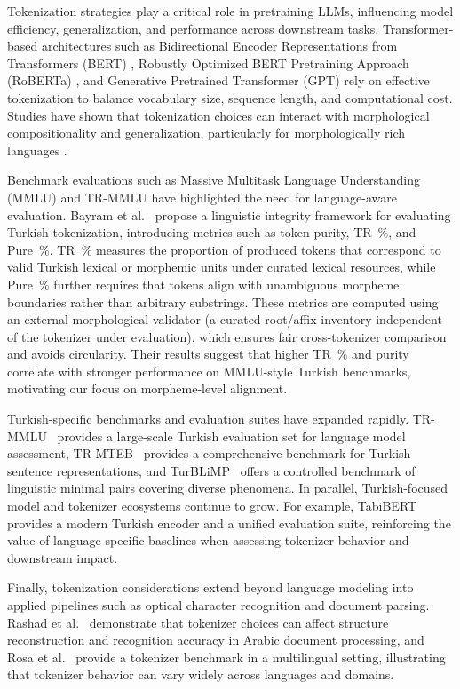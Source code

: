 Tokenization strategies play a critical role in pretraining LLMs, influencing model efficiency, generalization, and performance across downstream tasks. Transformer-based architectures such as Bidirectional Encoder Representations from Transformers (BERT) \cite{devlin_bert_2019}, Robustly Optimized BERT Pretraining Approach (RoBERTa) \cite{liu_roberta_2019}, and Generative Pretrained Transformer (GPT) \cite{radford_language_2019} rely on effective tokenization to balance vocabulary size, sequence length, and computational cost. Studies have shown that tokenization choices can interact with morphological compositionality and generalization, particularly for morphologically rich languages \cite{ismayilzada_evaluating_2025}.

Benchmark evaluations such as Massive Multitask Language Understanding (MMLU) \cite{hendrycks_measuring_2021} and TR-MMLU \cite{bayram_setting_2025} have highlighted the need for language-aware evaluation. Bayram et al.~\cite{bayram_tokenization_2025} propose a linguistic integrity framework for evaluating Turkish tokenization, introducing metrics such as token purity, TR~\%, and Pure~\%. TR~\% measures the proportion of produced tokens that correspond to valid Turkish lexical or morphemic units under curated lexical resources, while Pure~\% further requires that tokens align with unambiguous morpheme boundaries rather than arbitrary substrings. These metrics are computed using an external morphological validator (a curated root/affix inventory independent of the tokenizer under evaluation), which ensures fair cross-tokenizer comparison and avoids circularity. Their results suggest that higher TR~\% and purity correlate with stronger performance on MMLU-style Turkish benchmarks, motivating our focus on morpheme-level alignment.

Turkish-specific benchmarks and evaluation suites have expanded rapidly. TR-MMLU~\cite{bayram_setting_2025} provides a large-scale Turkish evaluation set for language model assessment, TR-MTEB~\cite{baysan-gungor-2025-tr} provides a comprehensive benchmark for Turkish sentence representations, and TurBLiMP~\cite{basar_turblimp_2025} offers a controlled benchmark of linguistic minimal pairs covering diverse phenomena. In parallel, Turkish-focused model and tokenizer ecosystems continue to grow. For example, TabiBERT~\cite{turker_tabibert_2026} provides a modern Turkish encoder and a unified evaluation suite, reinforcing the value of language-specific baselines when assessing tokenizer behavior and downstream impact.

Finally, tokenization considerations extend beyond language modeling into applied pipelines such as optical character recognition and document parsing. Rashad et al.~\cite{rashad_arabic_nougat_2024} demonstrate that tokenizer choices can affect structure reconstruction and recognition accuracy in Arabic document processing, and Rosa et al.~\cite{rosa_tokenizer_benchmark_2024} provide a tokenizer benchmark in a multilingual setting, illustrating that tokenizer behavior can vary widely across languages and domains.
